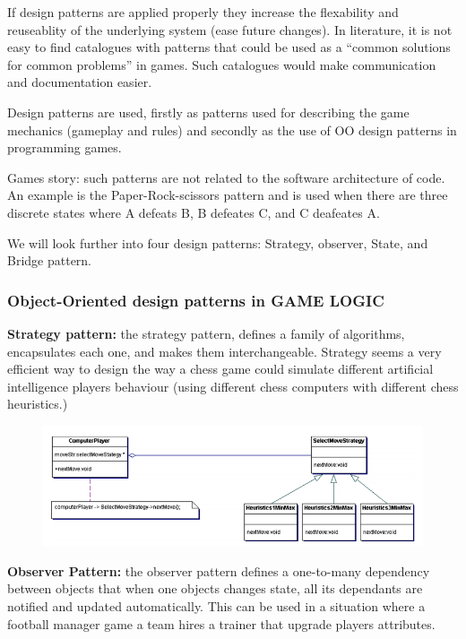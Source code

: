     If design patterns are applied properly they increase the flexability and reuseablity of the underlying system (ease future changes).
    In literature, it is not easy to find catalogues with patterns that could be used as a ``common solutions for common problems'' in games. Such catalogues would make communication and documentation easier. 

    Design patterns are used, firstly  as patterns used for describing the game mechanics (gameplay and rules) and secondly as the use of OO design patterns in programming games. 

    Games story: such patterns are not related to the software architecture of code. An example is the Paper-Rock-scissors pattern and is used when there are three discrete states where A defeats B, B defeates C, and C deafeates A. 

    We will look further into four design patterns: Strategy, observer, State, and Bridge pattern. 

    \subsubsection*{Object-Oriented design patterns in GAME LOGIC}

      {\bf Strategy pattern:} the strategy pattern, defines a family of algorithms, encapsulates each one, and makes them interchangeable. Strategy seems a very efficient way to design the way a chess game could simulate different artificial intelligence players behaviour (using different chess computers with different chess heuristics.)

      \begin{figure}[H]
        \includegraphics[width=\textwidth]{pics/strategypattern.png}
      \end{figure}

      {\bf Observer Pattern:} the observer pattern defines a one-to-many dependency between objects that when one objects changes state, all its dependants are notified and updated automatically. This can be used in a situation where a football manager game a team hires a trainer that upgrade players attributes.

